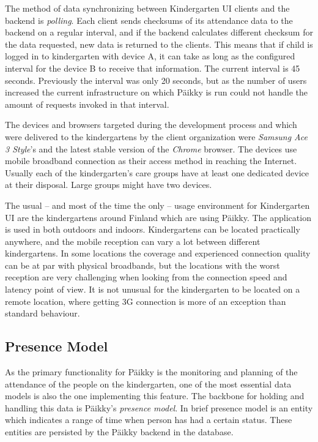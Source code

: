 The method of data synchronizing between Kindergarten UI clients and the backend is \textit{polling}. Each client sends checksums of its attendance data to the backend on a regular interval, and if the backend calculates different checksum for the data requested, new data is returned to the clients. This means that if child is logged in to kindergarten with device A, it can take as long as the configured interval for the device B to receive that information. The current interval is 45 seconds. Previously the interval was only 20 seconds, but as the  number of users increased the current infrastructure on which Päikky is run could not handle the amount of requests invoked in that interval. 

The devices and browsers targeted during the development process and which  were delivered to the kindergartens by the client organization were \textit{Samsung Ace 3 Style}'s and the latest stable version of the \textit{Chrome} browser. The devices use mobile broadband connection as their access method in reaching the Internet. Usually each of the kindergarten's care groups have at least one dedicated device at their disposal. Large groups might have two devices. 

The usual -- and most of the time the only -- usage environment for Kindergarten UI are the kindergartens around Finland which are using Päikky. The application is used in both outdoors and indoors. Kindergartens can be located practically anywhere, and the mobile reception can vary a lot between different kindergartens. In some locations the coverage and experienced connection quality can be at par with physical broadbands, but the locations with the worst reception are very challenging when looking from the connection speed and latency point of view. It is not unusual for the kindergarten to be located on a remote location, where getting 3G connection is more of an exception than standard behaviour. %


\subsection{Presence Model}


As the primary functionality for Päikky is the monitoring and planning of the attendance of the people on the kindergarten, one of the most essential data models is also the one implementing this feature. The backbone for holding and handling this data is Päikky's \textit{presence model}. In brief presence model is an entity which indicates a range of time when person has had a certain status. These entities are persisted by the Päikky backend in the database.

